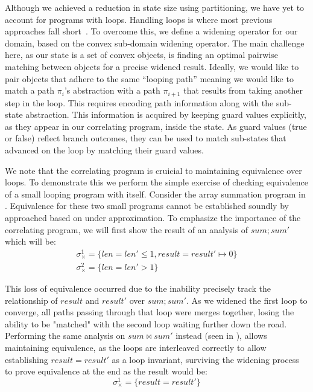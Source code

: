 

Although we achieved a reduction in state size using partitioning, we have yet to account for programs with loops. Handling loops is where most previous approaches fall short~\cite{GodlinStrichman09, KawaguchiLahiriRebelo10, DwyerElbaumPerson08, EnglerRamos11}. To overcome this, we define a widening operator for our domain, based on the convex sub-domain widening operator. The main challenge here, as our state is a set of convex objects, is finding an optimal pairwise matching between objects for a precise widened result. Ideally, we would like to pair objects that adhere to the same ``looping path'' meaning we would like to match a path $\pi_i$'s abstraction with a path $\pi_{i+1}$ that results from taking another step in the loop. This requires encoding path information along with the sub-state abstraction. This information is acquired by keeping guard values explicitly, as they appear in our correlating program, inside the state. As guard values (true or false) reflect branch outcomes, they can be used to match sub-states that advanced on the loop by matching their guard values.



We note that the correlating program is cruicial to maintaining equivalence over loops. To demonstrate this we perform the simple exercise of checking equivalence of a small looping program with itself. Consider the array summation program in . Equivalence for these two small programs cannot be established soundly by approached based on under approximation. To emphasize the importance of the correlating program, we will first show the result of an analysis of $sum;sum'$ which will be:
\[
\begin{array}{c}
\sigma_{\times}^1 = \{len = len' \leq 1, result = result' \mapsto 0\} \\
\sigma_{\times}^2 = \{len = len' > 1\}
\end{array}
\]


This loss of equivalence occurred due to the inability precisely track the relationship of $result$ and $result'$ over $sum;sum'$. As we widened the first loop to converge, all paths passing through that loop were merges together, losing the ability to be "matched" with the second loop waiting further down the road. Performing the same analysis on $sum \bowtie sum'$ instead (seen in ), allows maintaining equivalence, as the loops are interleaved correctly to allow establishing $result = result'$ as a loop invariant, surviving the widening process to prove equivalence at the end as the result would be:
\[
\sigma_{\times}^1 = \{result = result'\}
\]

